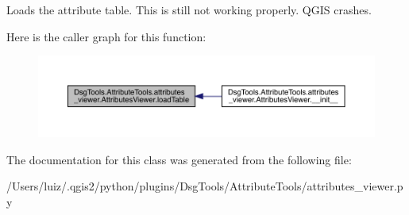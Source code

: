 \begin{DoxyVerb}Loads the attribute table. This is still not working properly. QGIS crashes.
\end{DoxyVerb}
 Here is the caller graph for this function\+:
\nopagebreak
\begin{figure}[H]
\begin{center}
\leavevmode
\includegraphics[width=350pt]{class_dsg_tools_1_1_attribute_tools_1_1attributes__viewer_1_1_attributes_viewer_aeb49b4d97a0b53de38bbe02c3d82c976_icgraph}
\end{center}
\end{figure}


The documentation for this class was generated from the following file\+:\begin{DoxyCompactItemize}
\item 
/\+Users/luiz/.\+qgis2/python/plugins/\+Dsg\+Tools/\+Attribute\+Tools/attributes\+\_\+viewer.\+py\end{DoxyCompactItemize}
